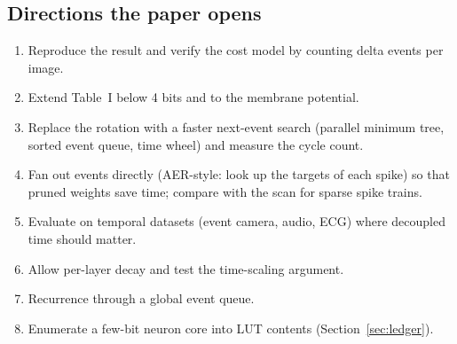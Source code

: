 \subsection{Directions the paper opens}
\begin{enumerate}[leftmargin=1.5em]
\item Reproduce the result and verify the cost model by counting delta events per image.
\item Extend Table~I below 4 bits and to the membrane potential.
\item Replace the rotation with a faster next-event search (parallel minimum tree, sorted event queue, time wheel) and measure the cycle count.
\item Fan out events directly (AER-style: look up the targets of each spike) so that pruned weights save time; compare with the scan for sparse spike trains.
\item Evaluate on temporal datasets (event camera, audio, ECG) where decoupled time should matter.
\item Allow per-layer decay and test the time-scaling argument.
\item Recurrence through a global event queue.
\item Enumerate a few-bit neuron core into LUT contents (Section~\ref{sec:ledger}).
\end{enumerate}
